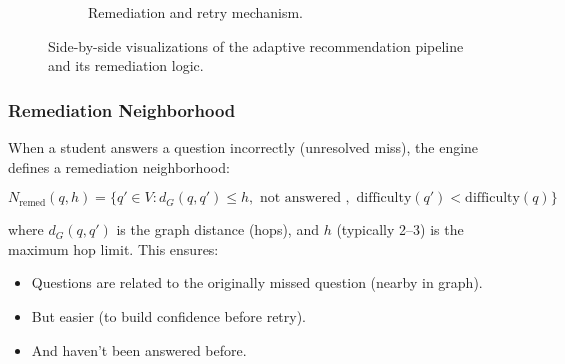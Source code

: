 \documentclass[sigconf,authordraft,twoside]{acmart}
\begin{document}
\begin{figure}[t]
\begin{subfigure}[t]{0.48\textwidth}
\caption{Remediation and retry mechanism.}
\end{subfigure}

\caption{Side-by-side visualizations of the adaptive recommendation pipeline and its remediation logic.}
\end{figure}

\subsubsection{Remediation Neighborhood}
When a student answers a question incorrectly (unresolved miss), the engine defines a remediation neighborhood:

\begin{equation}
N_{\text{remed}}(q, h) = \{q' \in V : d_G(q, q') \leq h, \text{ not answered }, \text{ difficulty}(q') < \text{difficulty}(q)\}
\end{equation}

where $d_G(q, q')$ is the graph distance (hops), and $h$ (typically 2--3) is the maximum hop limit. This ensures:
\begin{itemize}
\item Questions are related to the originally missed question (nearby in graph).
\item But easier (to build confidence before retry).
\item And haven't been answered before.
\end{itemize}
\end{document}
